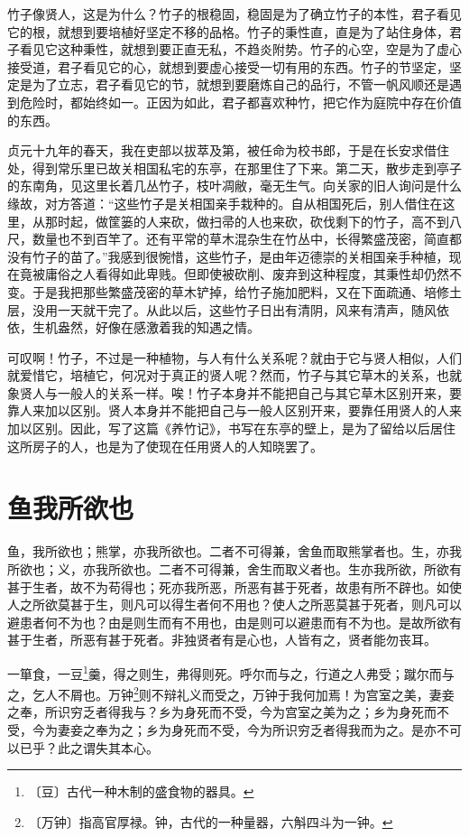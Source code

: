 \documentclass[12pt,UTF-8,openany,a4]{ctexbook}
\begin{document}
\begin{large}
    \yiwen 
    竹子像贤人，这是为什么？竹子的根稳固，稳固是为了确立竹子的本性，君子看见它的根，就想到要培植好坚定不移的品格。竹子的秉性直，直是为了站住身体，君子看见它这种秉性，就想到要正直无私，不趋炎附势。竹子的心空，空是为了虚心接受道，君子看见它的心，就想到要虚心接受一切有用的东西。竹子的节坚定，坚定是为了立志，君子看见它的节，就想到要磨炼自己的品行，不管一帆风顺还是遇到危险时，都始终如一。正因为如此，君子都喜欢种竹，把它作为庭院中存在价值的东西。
    
    贞元十九年的春天，我在吏部以拔萃及第，被任命为校书郎，于是在长安求借住处，得到常乐里已故关相国私宅的东亭，在那里住了下来。第二天，散步走到亭子的东南角，见这里长着几丛竹子，枝叶凋敝，毫无生气。向关家的旧人询问是什么缘故，对方答道：“这些竹子是关相国亲手栽种的。自从相国死后，别人借住在这里，从那时起，做筐篓的人来砍，做扫帚的人也来砍，砍伐剩下的竹子，高不到八尺，数量也不到百竿了。还有平常的草木混杂生在竹丛中，长得繁盛茂密，简直都没有竹子的苗了。”我感到很惋惜，这些竹子，是由年迈德崇的关相国亲手种植，现在竟被庸俗之人看得如此卑贱。但即使被砍削、废弃到这种程度，其秉性却仍然不变。于是我把那些繁盛茂密的草木铲掉，给竹子施加肥料，又在下面疏通、培修土层，没用一天就干完了。从此以后，这些竹子日出有清阴，风来有清声，随风依依，生机盎然，好像在感激着我的知遇之情。
    
    可叹啊！竹子，不过是一种植物，与人有什么关系呢？就由于它与贤人相似，人们就爱惜它，培植它，何况对于真正的贤人呢？然而，竹子与其它草木的关系，也就象贤人与一般人的关系一样。唉！竹子本身并不能把自己与其它草木区别开来，要靠人来加以区别。贤人本身并不能把自己与一般人区别开来，要靠任用贤人的人来加以区别。因此，写了这篇《养竹记》，书写在东亭的壁上，是为了留给以后居住这所房子的人，也是为了使现在任用贤人的人知晓罢了。
    
\end{large}



\chapter{鱼我所欲也}

\begin{large}
    
    鱼，我所欲也；熊掌，亦我所欲也。二者不可得兼，舍鱼而取熊掌者也。生，亦我所欲也；义，亦我所欲也。二者不可得兼，舍生而取义者也。生亦我所欲，所欲有甚于生者，故不为苟得也；死亦我所恶，所恶有甚于死者，故患有所不辟也。如使人之所欲莫甚于生，则凡可以得生者何不用也？使人之所恶莫甚于死者，则凡可以避患者何不为也？由是则生而有不用也，由是则可以避患而有不为也。是故所欲有甚于生者，所恶有甚于死者。非独贤者有是心也，人皆有之，贤者能勿丧耳。
    
    一箪食，一豆\footnote{〔豆〕\yiwen 古代一种木制的盛食物的器具。}羹，得之则生，弗得则死。呼尔而与之，行道之人弗受；蹴尔而与之，乞人不屑也。万钟\footnote{〔万钟〕\yiwen 指高官厚禄。钟，古代的一种量器，六斛四斗为一钟。}则不辩礼义而受之，万钟于我何加焉！为宫室之美，妻妾之奉，所识穷乏者得我与？乡为身死而不受，今为宫室之美为之；乡为身死而不受，今为妻妾之奉为之；乡为身死而不受，今为所识穷乏者得我而为之。是亦不可以已乎？此之谓失其本心。
\end{large}
\end{document}
